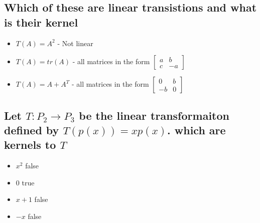 \documentclass[12pt, a4paper]{article}
\begin{document}
		\subsection{Which of these are linear transistions and what is their kernel}
			\begin{itemize}
				\item $T(A)=A^2$ - Not linear
				\item $T(A)=tr(A)$ - all matrices in the form $\begin{bmatrix}a & b \\ c & -a\end{bmatrix}$
				\item $T(A)=A+A^T$ - all matrices in the form $\begin{bmatrix}0 & b\\ -b & 0\end{bmatrix}$
			\end{itemize}
		\subsection{Let $T: P_2\rightarrow P_3$ be the linear transformaiton defined by $T(p(x))=xp(x)$. which are kernels to $T$}
			\begin{itemize}
				\item $x^2$ false
				\item $0$ true
				\item $x+1$ false
				\item $-x$ false
			\end{itemize}
\end{document}
